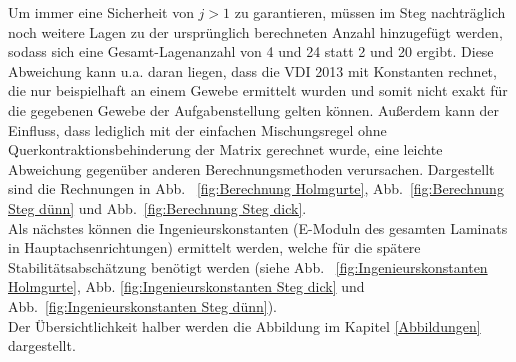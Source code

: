 \noindent Um immer eine Sicherheit von $j>1$ zu garantieren, müssen im Steg nachträglich noch weitere Lagen zu der ursprünglich berechneten Anzahl hinzugefügt werden, sodass sich eine Gesamt-Lagenanzahl von 4 und 24 statt 2 und 20 ergibt. Diese Abweichung kann u.a. daran liegen, dass die VDI 2013 mit Konstanten rechnet, die nur beispielhaft an einem Gewebe ermittelt wurden und somit nicht exakt für die gegebenen Gewebe der Aufgabenstellung gelten können. Außerdem kann der Einfluss, dass lediglich mit der einfachen Mischungsregel ohne Querkontraktionsbehinderung der Matrix gerechnet wurde, eine leichte Abweichung gegenüber anderen Berechnungsmethoden verursachen.
Dargestellt sind die Rechnungen in Abb. ~\ref{fig:Berechnung Holmgurte}, Abb.~\ref{fig:Berechnung Steg dünn} und Abb.~\ref{fig:Berechnung Steg dick}.\\

\noindent Als nächstes können die Ingenieurskonstanten (E-Moduln des gesamten Laminats in Hauptachsenrichtungen) ermittelt werden, welche für die spätere Stabilitätsabschätzung benötigt werden (siehe Abb. ~\ref{fig:Ingenieurskonstanten Holmgurte}, Abb. \ref{fig:Ingenieurskonstanten Steg dick} und Abb.~\ref{fig:Ingenieurskonstanten Steg dünn}).\\

\noindent Der Übersichtlichkeit halber werden die Abbildung im Kapitel \ref{Abbildungen} dargestellt.